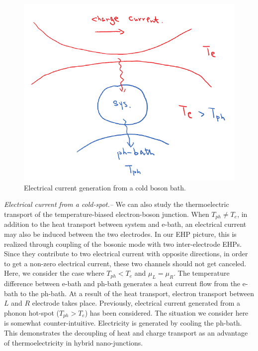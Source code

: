 \documentclass[aps
,twocolumn
,floatfix,footinbib,prl,longbibliography
]{revtex4-1}
\begin{document}
\begin{figure}[h]
	\includegraphics[scale=0.6,angle=0]{coldspot-v2.pdf}
	\caption{Electrical current generation from a cold boson bath.}
	\label{fig:coldspot}
\end{figure}


\emph{ Electrical current from a cold-spot.--}
We can also study the thermoelectric transport of the temperature-biased electron-boson junction. When $T_{ph}\neq T_e$, in addition to the heat transport between system and e-bath, an electrical current may also be induced between the two electrodes\cite{entinwuhlman2010three,sanchez2011optimal}. In our EHP picture, this is realized through coupling of the bosonic mode with two inter-electrode EHPs. Since they contribute to two electrical current with opposite directions, in order to get a non-zero electrical current, these two channels should not get canceled. Here, we consider the case where $T_{ph}<T_{e}$ and $\mu_L=\mu_R$. The temperature difference between e-bath and ph-bath generates a heat current flow from the e-bath to the ph-bath. At a result of the heat transport, electron transport between $L$ and $R$ electrode takes place. Previously, electrical current generated from a phonon hot-spot ($T_{ph}>T_e$) has been considered\cite{entinwuhlman2010three}. The situation we consider here is somewhat counter-intuitive. Electricity is generated by cooling the ph-bath. This demonstrates the decoupling of heat and charge transport as an advantage of thermoelectricity in hybrid nano-junctions.
\end{document}

